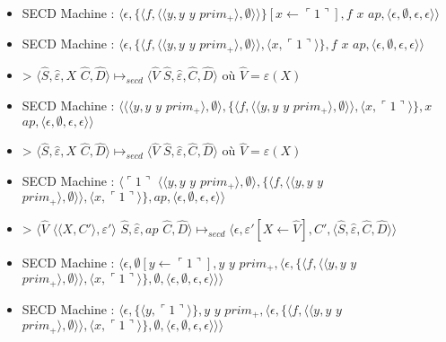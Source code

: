 \documentclass[10pt,a4paper]{article}
\begin{document}
\begin{itemize}
						\item[] SECD Machine : $\langle\epsilon,\{\langle f,\langle\langle y,y$ $y$ $prim_{+}\rangle,\emptyset\rangle\rangle\}[x \leftarrow \ulcorner 1\urcorner],f$ $x$ $ap,\langle\epsilon,\emptyset,\epsilon,\epsilon\rangle\rangle$
						\item[] SECD Machine : $\langle\epsilon,\{\langle f,\langle\langle y,y$ $y$ $prim_{+}\rangle,\emptyset\rangle\rangle,\langle x,\ulcorner 1\urcorner\rangle\},f$ $x$ $ap,\langle\epsilon,\emptyset,\epsilon,\epsilon\rangle\rangle$
						\item[] > $\langle\widehat{S},\widehat{\varepsilon},X$ $\widehat{C},\widehat{D}\rangle \longmapsto_{secd} \langle \widehat{V}$ $\widehat{S},\widehat{\varepsilon},\widehat{C},\widehat{D}\rangle$ où $\widehat{V} = \varepsilon(X)$
						\item[] SECD Machine : $\langle\langle\langle y,y$ $y$ $prim_{+}\rangle,\emptyset\rangle,\{\langle f,\langle\langle y,y$ $y$ $prim_{+}\rangle,\emptyset\rangle\rangle,\langle x,\ulcorner 1\urcorner\rangle\},x$ $ap,\langle\epsilon,\emptyset,\epsilon,\epsilon\rangle\rangle$
						\item[] > $\langle\widehat{S},\widehat{\varepsilon},X$ $\widehat{C},\widehat{D}\rangle \longmapsto_{secd} \langle \widehat{V}$ $\widehat{S},\widehat{\varepsilon},\widehat{C},\widehat{D}\rangle$ où $\widehat{V} = \varepsilon(X)$
						\item[] SECD Machine : $\langle\ulcorner 1\urcorner$ $\langle\langle y,y$ $y$ $prim_{+}\rangle,\emptyset\rangle,\{\langle f,\langle\langle y,y$ $y$ $prim_{+}\rangle,\emptyset\rangle\rangle,\langle x,\ulcorner 1\urcorner\rangle\},ap,\langle\epsilon,\emptyset,\epsilon,\epsilon\rangle\rangle$
						\item[] >  $\langle\widehat{V}$ $\langle\langle X,C'\rangle,\varepsilon'\rangle$ $\widehat{S},\widehat{\varepsilon},ap$ $\widehat{C},\widehat{D}\rangle \longmapsto_{secd} \langle\epsilon,\varepsilon'[X \leftarrow \widehat{V}],C',\langle\widehat{S},\widehat{\varepsilon},\widehat{C},\widehat{D}\rangle\rangle$
						\item[] SECD Machine :	$\langle\epsilon,\emptyset[y \leftarrow \ulcorner 1\urcorner],y$ $y$ $prim_{+},\langle\epsilon,\{\langle f,\langle\langle y,y$ $y$ $prim_{+}\rangle,\emptyset\rangle\rangle,\langle x,\ulcorner 1\urcorner\rangle\} ,\emptyset,\langle\epsilon,\emptyset,\epsilon,\epsilon\rangle\rangle\rangle$
						\item[] SECD Machine : $\langle\epsilon,\{\langle y,\ulcorner 1\urcorner\rangle\},y$ $y$ $prim_{+},\langle\epsilon,\{\langle f,\langle\langle y,y$ $y$ $prim_{+}\rangle,\emptyset\rangle\rangle,\langle x,\ulcorner 1\urcorner\rangle\} ,\emptyset,\langle\epsilon,\emptyset,\epsilon,\epsilon\rangle\rangle\rangle$

\end{itemize}
\end{document}
